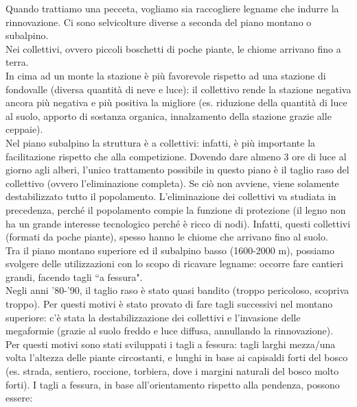 Quando trattiamo una pecceta, vogliamo sia raccogliere legname che indurre la rinnovazione. Ci sono selvicolture diverse a seconda del piano montano o subalpino.\\
Nei collettivi, ovvero piccoli boschetti di poche piante, le chiome arrivano fino a terra.\\
In cima ad un monte la stazione è più favorevole rispetto ad una stazione di fondovalle (diversa quantità di neve e luce): il collettivo rende la stazione negativa ancora più negativa e più positiva la migliore (es. riduzione della quantità di luce al suolo, apporto di sostanza organica, innalzamento della stazione grazie alle ceppaie).\\
Nel piano subalpino la struttura è a collettivi: infatti, è più importante la facilitazione rispetto che alla competizione. Dovendo dare almeno 3 ore di luce al giorno agli alberi, l'unico trattamento possibile in questo piano è il taglio raso del collettivo (ovvero l'eliminazione completa). Se ciò non avviene, viene solamente destabilizzato tutto il popolamento. L'eliminazione dei collettivi va studiata in precedenza, perché il popolamento compie la funzione di protezione (il legno non ha un grande interesse tecnologico perché è ricco di nodi). Infatti, questi collettivi (formati da poche piante), spesso hanno le chiome che arrivano fino al suolo.\\
Tra il piano montano superiore ed il subalpino basso (1600-2000 m), possiamo svolgere delle utilizzazioni con lo scopo di ricavare legname: occorre fare cantieri grandi, facendo tagli ``a fessura".\\
Negli anni '80-'90, il taglio raso è stato quasi bandito (troppo pericoloso, scopriva troppo). Per questi motivi è stato provato di fare tagli successivi nel montano superiore: c'è stata la destabilizzazione dei collettivi e l'invasione delle megaformie (grazie al suolo  freddo e luce diffusa, annullando la rinnovazione).\\
Per questi motivi sono stati sviluppati i tagli a fessura: tagli larghi mezza/una volta l'altezza delle piante circostanti, e lunghi in base ai capisaldi forti del bosco (es. strada, sentiero, roccione, torbiera, dove i margini naturali del bosco molto forti). I tagli a fessura, in base all'orientamento rispetto alla pendenza, possono essere:
